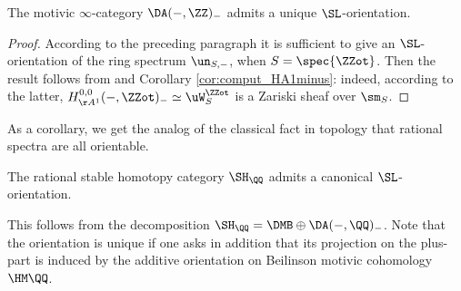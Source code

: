 \begin{thm}\label{thm:DA_SL-oriented}
The motivic $\infty$-category $\DA(-,\ZZ)_-$
admits a unique $\SL$\nobreakdash-ori\-en\-tation.
\end{thm}
\begin{proof}
According to the preceding paragraph it is sufficient to give an $\SL$\nobreakdash-ori\-en\-tation
of the ring spectrum $\un_{S,-}$, when $S=\spec{\ZZot}$.
Then the result follows from \cite[Cor.\,5.4]{AnaSL}
and Corollary \ref{cor:comput_HA1minus}: indeed, according to the latter,
$H^{0,0}_{\AA^1}(-,\ZZot)_- \simeq \uW^{\ZZot}_S$ is a Zariski sheaf over $\sm_S$.
\end{proof}

As a corollary, we get the analog of the classical fact in topology that rational spectra
are all orientable.
\begin{cor}\label{cor:SHQ_SL-oriented}
The rational stable homotopy category $\SH_\QQ$ admits a canonical $\SL$-orientation.
\end{cor}
This follows from the decomposition $\SH_\QQ=\DMB \oplus \DA(-,\QQ)_-$.
Note that the orientation is unique if one asks in addition that its projection on the plus-part
is induced by the additive orientation on Beilinson motivic cohomology $\HM \QQ$.

